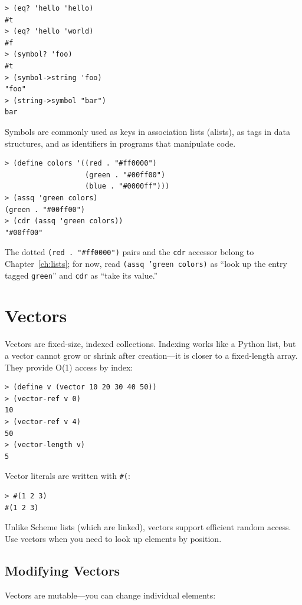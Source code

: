 \begin{lstlisting}[style=repl]
> (eq? 'hello 'hello)
#t
> (eq? 'hello 'world)
#f
> (symbol? 'foo)
#t
> (symbol->string 'foo)
"foo"
> (string->symbol "bar")
bar
\end{lstlisting}

Symbols are commonly used as keys in association lists (alists), as tags in data structures, and as identifiers in programs that manipulate code.

\begin{lstlisting}[style=repl]
> (define colors '((red . "#ff0000")
                   (green . "#00ff00")
                   (blue . "#0000ff")))
> (assq 'green colors)
(green . "#00ff00")
> (cdr (assq 'green colors))
"#00ff00"
\end{lstlisting}

The dotted \texttt{(red . "\#ff0000")} pairs and the \texttt{cdr} accessor belong to Chapter~\ref{ch:lists}; for now, read \texttt{(assq 'green colors)} as ``look up the entry tagged \texttt{green}'' and \texttt{cdr} as ``take its value.''

\section{Vectors}

Vectors are fixed-size, indexed collections. Indexing works like a Python list, but a vector cannot grow or shrink after creation---it is closer to a fixed-length array. They provide O(1) access by index:

\begin{lstlisting}[style=repl]
> (define v (vector 10 20 30 40 50))
> (vector-ref v 0)
10
> (vector-ref v 4)
50
> (vector-length v)
5
\end{lstlisting}

Vector literals are written with \texttt{\#(}:

\begin{lstlisting}[style=repl]
> #(1 2 3)
#(1 2 3)
\end{lstlisting}

Unlike Scheme lists (which are linked), vectors support efficient random access. Use vectors when you need to look up elements by position.

\subsection{Modifying Vectors}

Vectors are mutable---you can change individual elements:

